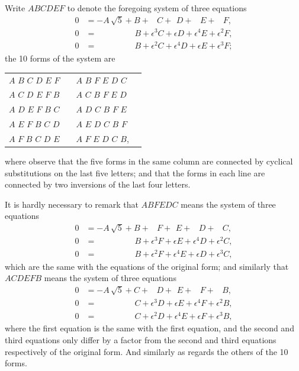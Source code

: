 \documentclass[11pt,a4paper]{book}
\begin{document}
Write $ABCDEF$ to denote the foregoing system of three equations
\begin{align*}
0 &= -A\,\sqrt{5} + B + \phantom{\epsilon^3}C + \phantom{\epsilon}D + \phantom{\epsilon^4}E + \phantom{\epsilon^2}F,\\
0 &= \phantom{-A\sqrt{5} +}\; B + \epsilon^3 C + \epsilon D + \epsilon^4 E + \epsilon^2 F,\\
0 &= \phantom{-A\sqrt{5} +}\; B + \epsilon^2 C + \epsilon^4 D + \epsilon E + \epsilon^3 F;
\end{align*}
the 10 forms of the system are

\begin{center}
\begin{tabular}{ll|ll}
$A$ $B$ $C$ $D$ $E$ $F$ & & $A$ $B$ $F$ $E$ $D$ $C$ \\
$A$ $C$ $D$ $E$ $F$ $B$ & & $A$ $C$ $B$ $F$ $E$ $D$ \\
$A$ $D$ $E$ $F$ $B$ $C$ & & $A$ $D$ $C$ $B$ $F$ $E$ \\
$A$ $E$ $F$ $B$ $C$ $D$ & & $A$ $E$ $D$ $C$ $B$ $F$ \\
$A$ $F$ $B$ $C$ $D$ $E$ & & $A$ $F$ $E$ $D$ $C$ $B$,
\end{tabular}
\end{center}

where observe that the five forms in the same column are connected by cyclical
substitutions on the last five letters; and that the forms in each line are connected
by two inversions of the last four letters.

It is hardly necessary to remark that $ABFEDC$ means the system of three equations
\begin{align*}
0 &= -A\,\sqrt{5} + B + \phantom{\epsilon^3}F + \phantom{\epsilon}E + \phantom{\epsilon^4}D + \phantom{\epsilon^2}C,\\
0 &= \phantom{-A\sqrt{5} +}\; B + \epsilon^3 F + \epsilon E + \epsilon^4 D + \epsilon^2 C,\\
0 &= \phantom{-A\sqrt{5} +}\; B + \epsilon^2 F + \epsilon^4 E + \epsilon D + \epsilon^3 C,
\end{align*}
which are the same with the equations of the original form; and similarly that
$ACDEFB$ means the system of three equations
\begin{align*}
0 &= -A\,\sqrt{5} + C + \phantom{\epsilon^3}D + \phantom{\epsilon}E + \phantom{\epsilon^4}F + \phantom{\epsilon^2}B,\\
0 &= \phantom{-A\sqrt{5} +}\; C + \epsilon^3 D + \epsilon E + \epsilon^4 F + \epsilon^2 B,\\
0 &= \phantom{-A\sqrt{5} +}\; C + \epsilon^2 D + \epsilon^4 E + \epsilon F + \epsilon^3 B,
\end{align*}
where the first equation is the same with the first equation, and the second and
third equations only differ by a factor from the second and third equations respectively
of the original form. And similarly as regards the others of the 10 forms.
\end{document}
